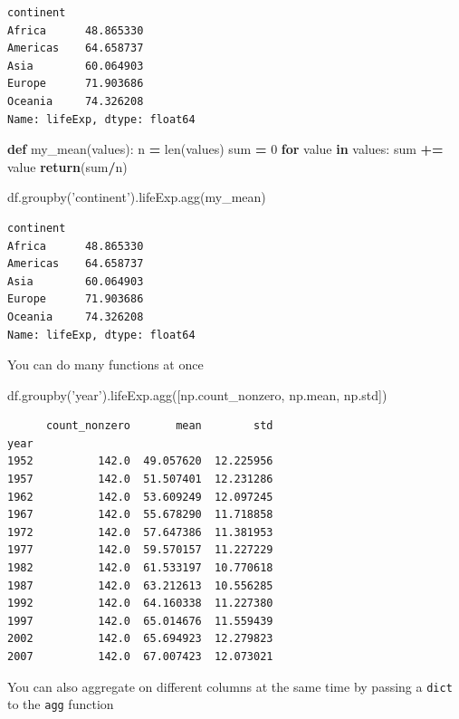 \documentclass[
  letterpaper,
]{scrbook}
\newenvironment{Shaded}{\begin{snugshade}}{\end{snugshade}}
\newcommand{\BuiltInTok}[1]{#1}
\newcommand{\ControlFlowTok}[1]{\textcolor[rgb]{0.13,0.29,0.53}{\textbf{#1}}}
\newcommand{\DecValTok}[1]{\textcolor[rgb]{0.00,0.00,0.81}{#1}}
\newcommand{\KeywordTok}[1]{\textcolor[rgb]{0.13,0.29,0.53}{\textbf{#1}}}
\newcommand{\NormalTok}[1]{#1}
\newcommand{\OperatorTok}[1]{\textcolor[rgb]{0.81,0.36,0.00}{\textbf{#1}}}
\newcommand{\StringTok}[1]{\textcolor[rgb]{0.31,0.60,0.02}{#1}}
\begin{document}
\begin{verbatim}
continent
Africa      48.865330
Americas    64.658737
Asia        60.064903
Europe      71.903686
Oceania     74.326208
Name: lifeExp, dtype: float64
\end{verbatim}

\begin{Shaded}
\begin{Highlighting}[]
\KeywordTok{def}\NormalTok{ my_mean(values):}
\NormalTok{    n }\OperatorTok{=} \BuiltInTok{len}\NormalTok{(values)}
    \BuiltInTok{sum} \OperatorTok{=} \DecValTok{0}
    \ControlFlowTok{for}\NormalTok{ value }\KeywordTok{in}\NormalTok{ values:}
        \BuiltInTok{sum} \OperatorTok{+=}\NormalTok{ value}
    \ControlFlowTok{return}\NormalTok{(}\BuiltInTok{sum}\OperatorTok{/}\NormalTok{n)}

\NormalTok{df.groupby(}\StringTok{'continent'}\NormalTok{).lifeExp.agg(my_mean)}
\end{Highlighting}
\end{Shaded}

\begin{verbatim}
continent
Africa      48.865330
Americas    64.658737
Asia        60.064903
Europe      71.903686
Oceania     74.326208
Name: lifeExp, dtype: float64
\end{verbatim}

You can do many functions at once

\begin{Shaded}
\begin{Highlighting}[]
\NormalTok{df.groupby(}\StringTok{'year'}\NormalTok{).lifeExp.agg([np.count_nonzero, np.mean, np.std])}
\end{Highlighting}
\end{Shaded}

\begin{verbatim}
      count_nonzero       mean        std
year                                     
1952          142.0  49.057620  12.225956
1957          142.0  51.507401  12.231286
1962          142.0  53.609249  12.097245
1967          142.0  55.678290  11.718858
1972          142.0  57.647386  11.381953
1977          142.0  59.570157  11.227229
1982          142.0  61.533197  10.770618
1987          142.0  63.212613  10.556285
1992          142.0  64.160338  11.227380
1997          142.0  65.014676  11.559439
2002          142.0  65.694923  12.279823
2007          142.0  67.007423  12.073021
\end{verbatim}

You can also aggregate on different columns at the same time by passing a \texttt{dict} to the \texttt{agg} function
\end{document}

